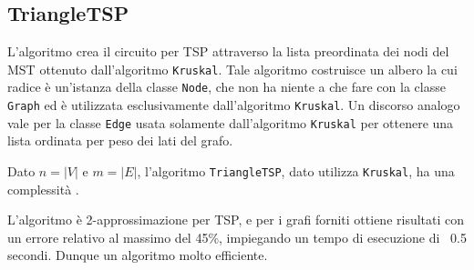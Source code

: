 \subsection{TriangleTSP}

L'algoritmo crea il circuito per TSP attraverso la lista preordinata dei nodi del MST ottenuto dall'algoritmo \texttt{Kruskal}. Tale algoritmo costruisce un albero la cui radice è un'istanza della classe \texttt{Node}, che non ha niente a che fare con la classe \texttt{Graph} ed è utilizzata esclusivamente dall'algoritmo \texttt{Kruskal}. Un discorso analogo vale per la classe \texttt{Edge} usata solamente dall'algoritmo \texttt{Kruskal} per ottenere una lista ordinata per peso dei lati del grafo.

Dato $n=|V|$ e $m=|E|$, l'algoritmo \texttt{TriangleTSP}, dato utilizza \texttt{Kruskal}, ha una complessità .

L'algoritmo è 2-approssimazione per TSP, e per i grafi forniti ottiene risultati con un errore relativo al massimo del 45\%, impiegando un tempo di esecuzione di ~0.5 secondi. Dunque un algoritmo molto efficiente.

